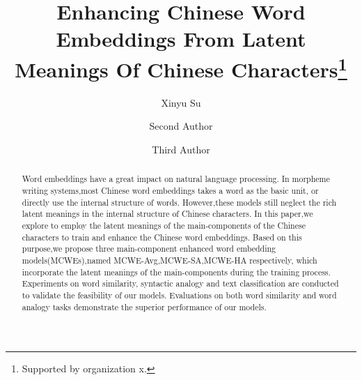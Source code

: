 \documentclass[runningheads]{llncs}
\begin{document}
%
%
\title{Enhancing Chinese Word Embeddings From Latent Meanings Of Chinese Characters\thanks{Supported by organization x.}}
%
%
\author{Xinyu Su \and
Second Author \and
Third Author}
%
%
%
\maketitle              %
%
\begin{abstract}
Word embeddings have a great impact on natural language processing.
In morpheme writing systems,most Chinese word embeddings takes a word as the basic unit, or directly use the internal structure of words.
However,these models still neglect the rich latent meanings in the internal structure of Chinese characters.
In this paper,we explore to employ the latent meanings of the main-components of the Chinese characters to train and enhance the Chinese word embeddings.
Based on this purpose,we propose three main-component enhanced word embedding models(MCWEs),named MCWE-Avg,MCWE-SA,MCWE-HA respectively,
which incorporate the latent meanings of the main-components during the training process.
Experiments on word similarity, syntactic analogy and text classification are conducted to validate the feasibility of our models.
Evaluations on both word similarity and word analogy tasks demonstrate the superior performance of our models.

\end{abstract}
%
%
%
\end{document}
